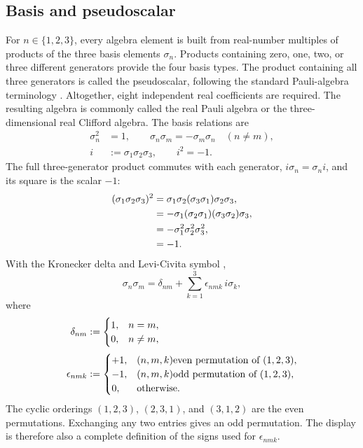 \documentclass[10pt,letterpaper]{article}
\let\STAamsmathtext\text
\renewcommand{\text}[1]{\STAamsmathtext{\normalfont\rmfamily #1}}
\newcommand{\pv}[1]{#1}
\begin{document}
\subsection{Basis and pseudoscalar}
For \(n\in\{1,2,3\}\), every algebra element is built from real-number
multiples of products of the three basis elements \(\pv{\sigma}_n\).
Products containing zero, one, two, or three different generators provide
the four basis types. The product containing all three generators is called
the pseudoscalar, following the standard Pauli-algebra terminology
\cite{hestenes1966,baylis1999,doran2003}. Altogether, eight independent real
coefficients are required. The resulting algebra is commonly called the real
Pauli algebra or the three-dimensional real Clifford algebra.
The basis relations are
\begin{equation}
\begin{aligned}
\pv{\sigma}_n^2&=1,\qquad \pv{\sigma}_n\pv{\sigma}_m=-\pv{\sigma}_m\pv{\sigma}_n\quad (n\neq m),\\
i&:=\pv{\sigma}_1\pv{\sigma}_2\pv{\sigma}_3,\qquad i^2=-1.
\end{aligned}
\label{eq:basis}
\end{equation}
The full three-generator product commutes with each generator,
\(i\pv{\sigma}_n=\pv{\sigma}_n i\), and its square is the scalar \(-1\):
\begin{align*}
(\pv{\sigma}_1\pv{\sigma}_2\pv{\sigma}_3)^2
&= \pv{\sigma}_1\pv{\sigma}_2(\pv{\sigma}_3\pv{\sigma}_1)\pv{\sigma}_2\pv{\sigma}_3,\notag\\
&= -\pv{\sigma}_1(\pv{\sigma}_2\pv{\sigma}_1)(\pv{\sigma}_3\pv{\sigma}_2)\pv{\sigma}_3,\notag\\
&= -\pv{\sigma}_1^2\pv{\sigma}_2^2\pv{\sigma}_3^2,\notag\\
&= -1.
\end{align*}
With the Kronecker delta and Levi-Civita symbol
\cite{hestenes1966,doran2003},
\begin{equation}
\pv{\sigma}_n\pv{\sigma}_m=\delta_{nm}+\sum_{k=1}^3\epsilon_{nmk}\,i\pv{\sigma}_k,
\label{eq:sigma-product}
\end{equation}
where
\begin{align*}
\delta_{nm} &:= \begin{cases}
1,& n=m,\\
0,& n\neq m,
\end{cases}\\[0.25em]
\epsilon_{nmk} &:= \begin{cases}
+1,& (n,m,k)\text{ even permutation of }(1,2,3),\\
-1,& (n,m,k)\text{ odd permutation of }(1,2,3),\\
0,& \text{otherwise}.
\end{cases}
\end{align*}
The cyclic orderings \((1,2,3)\), \((2,3,1)\), and \((3,1,2)\) are the even
permutations. Exchanging any two entries gives an odd permutation. The
display is therefore also a complete definition of the signs used for
\(\epsilon_{nmk}\).
\end{document}
